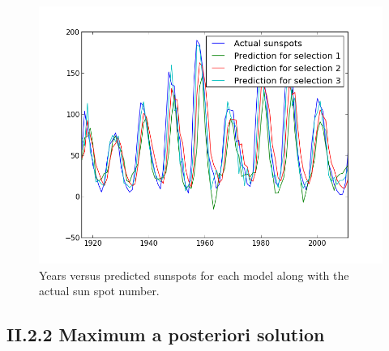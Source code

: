 \documentclass[12pt]{article}
\begin{document}
    \begin{figure}[h]
      \centering
        \includegraphics[width=1.0\textwidth]{figures/figure_II_2_1_2}
      \caption{Years versus predicted sunspots for each model along with the actual sun spot number.}
      \label{fig:years_vs_predicted}
    \end{figure}

  \subsection*{II.2.2 Maximum a posteriori solution}
\end{document}
